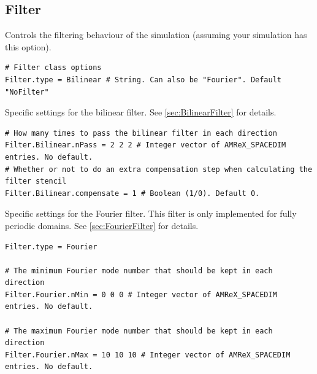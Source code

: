 \documentclass[11pt]{article}
\begin{document}
\subsection{Filter}\label{sec:FilterInput}
Controls the filtering behaviour of the simulation (assuming your simulation has this option).
\begin{lstlisting}[language=pkgconfig]
# Filter class options
Filter.type = Bilinear # String. Can also be "Fourier". Default "NoFilter"
\end{lstlisting}

Specific settings for the bilinear filter. See \ref{sec:BilinearFilter} for details.
\begin{lstlisting}[language=pkgconfig]
# How many times to pass the bilinear filter in each direction
Filter.Bilinear.nPass = 2 2 2 # Integer vector of AMReX_SPACEDIM entries. No default.
# Whether or not to do an extra compensation step when calculating the filter stencil
Filter.Bilinear.compensate = 1 # Boolean (1/0). Default 0.
\end{lstlisting}

Specific settings for the Fourier filter. This filter is only implemented for fully periodic domains. See \ref{sec:FourierFilter} for details.
\begin{lstlisting}[language=pkgconfig]
Filter.type = Fourier

# The minimum Fourier mode number that should be kept in each direction
Filter.Fourier.nMin = 0 0 0 # Integer vector of AMReX_SPACEDIM entries. No default.

# The maximum Fourier mode number that should be kept in each direction
Filter.Fourier.nMax = 10 10 10 # Integer vector of AMReX_SPACEDIM entries. No default.
\end{lstlisting}
\end{document}
